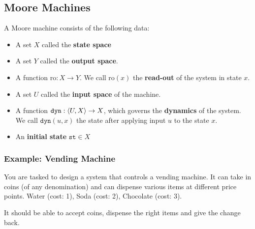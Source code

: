 \subsection{Moore Machines}
A Moore machine consists of the following data:
\begin{itemize}
  \item A set $X$ called the \textbf{state space}
  \item A set $Y$ called the \textbf{output space}.
  \item A function $\text{ro}: X \to Y$. We call $\text{ro}(x)$ the \textbf{read-out} of the system in state $x$.
  \item A set $U$ called the \textbf{input space} of the machine.
  \item A function $\texttt{dyn}: \langle U,X\rangle \to X$, which governs the \textbf{dynamics} of the system.
    We call $\texttt{dyn}(u,x)$ the state after applying input $u$ to the state $x$.
  \item An \textbf{initial state} $\texttt{st} \in X$
\end{itemize}


\subsubsection{Example: Vending Machine}
You are tasked to design a system that controls a vending machine.
It can take in coins (of any denomination) and can dispense various items at different price points.
Water (cost: 1), Soda (cost: 2), Chocolate (cost: 3). 

It should be able to accept coins, dispense the right items and give the change back.

